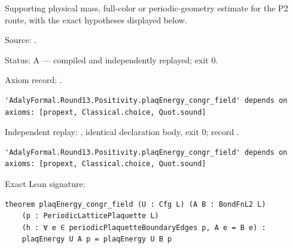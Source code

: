 \begin{theorem}[bp-463]
\label{bp-463}
\uses{}
\leanok
Supporting physical mass, full-color or periodic-geometry estimate for the P2 route, with the exact hypotheses displayed below.

\par Source: \texttt{}.
\par Status: A — compiled and independently replayed; exit 0.
\par Axiom record: \texttt{}.
\begin{verbatim}
'AdalyFormal.Round13.Positivity.plaqEnergy_congr_field' depends on axioms: [propext, Classical.choice, Quot.sound]
\end{verbatim}
\par Independent replay: \texttt{}, identical declaration body, exit 0; record \texttt{}.
\begin{verbatim}
'AdalyFormal.Round13.Positivity.plaqEnergy_congr_field' depends on axioms: [propext, Classical.choice, Quot.sound]
\end{verbatim}
\par Exact Lean signature:
\begin{verbatim}
theorem plaqEnergy_congr_field (U : Cfg L) (A B : BondFnL2 L)
    (p : PeriodicLatticePlaquette L)
    (h : ∀ e ∈ periodicPlaquetteBoundaryEdges p, A e = B e) :
    plaqEnergy U A p = plaqEnergy U B p
\end{verbatim}
\end{theorem}

